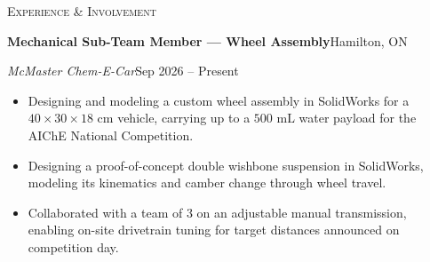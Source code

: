 \documentclass[a4paper]{article}
\newcommand{\lineunder} {
    \par\vspace*{-2pt}
    \noindent\hrulefill
    \par\vspace*{2pt}
}
\newcommand{\header}[1]{
    \vspace*{3pt}
    {\hspace*{-4pt}\large\textsc{#1}}
    \lineunder
}
\begin{document}
\vspace{1.5mm}

\header{Experience \& Involvement}
\vspace{1.5mm}

\textbf{Mechanical Sub-Team Member --- Wheel Assembly}\hfill Hamilton, ON \par
\textit{McMaster Chem-E-Car}\hfill Sep 2026 -- Present
\vspace{1mm}
\begin{itemize}
    \item Designing and modeling a custom wheel assembly in SolidWorks for a $40 \times 30 \times 18\text{ cm}$ vehicle, carrying up to a $500\text{ mL}$ water payload for the AIChE National Competition.
    \item Designing a proof-of-concept double wishbone suspension in SolidWorks, modeling its kinematics and camber change through wheel travel.
    \item Collaborated with a team of 3 on an adjustable manual transmission, enabling on-site drivetrain tuning for target distances announced on competition day.
\end{itemize}

\vspace{1.5mm}
\end{document}
